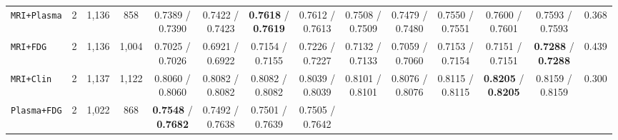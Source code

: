 \documentclass[10pt,twocolumn]{article}
\begin{document}
\begin{table}[t]
{\begin{tabular}{@{}>{\raggedright\arraybackslash}p{2.65cm}ccccccccccccc@{}}
\midrule
\texttt{MRI+Plasma} & 2 & 1,136 & 858 & \shortstack{0.7389 /\\0.7390} & \shortstack{0.7422
/\\0.7423} & \shortstack{\textbf{0.7618} /\\\textbf{0.7619}} & \shortstack{0.7612 /\\0.7613} &
\shortstack{0.7508 /\\0.7509} & \shortstack{0.7479 /\\0.7480} & \shortstack{0.7550 /\\0.7551} &
\shortstack{0.7600 /\\0.7601} & \shortstack{0.7593 /\\0.7593} & 0.368 \\
\texttt{MRI+FDG} & 2 & 1,136 & 1,004 & \shortstack{0.7025 /\\0.7026} & \shortstack{0.6921
/\\0.6922} & \shortstack{0.7154 /\\0.7155} & \shortstack{0.7226 /\\0.7227} & \shortstack{0.7132
/\\0.7133} & \shortstack{0.7059 /\\0.7060} & \shortstack{0.7153 /\\0.7154} &
\shortstack{0.7151 /\\0.7151} & \shortstack{\textbf{0.7288} /\\\textbf{0.7288}} & 0.439 \\
\texttt{MRI+Clin} & 2 & 1,137 & 1,122 & \shortstack{0.8060 /\\0.8060} & \shortstack{0.8082
/\\0.8082} & \shortstack{0.8082 /\\0.8082} & \shortstack{0.8039 /\\0.8039} & \shortstack{0.8101
/\\0.8101} & \shortstack{0.8076 /\\0.8076} & \shortstack{0.8115 /\\0.8115} &
\shortstack{\textbf{0.8205} /\\\textbf{0.8205}} & \shortstack{0.8159 /\\0.8159} & 0.300 \\
\texttt{Plasma+FDG} & 2 & 1,022 & 868 & \shortstack{\textbf{0.7548} /\\\textbf{0.7682}} &
\shortstack{0.7492 /\\0.7638} & \shortstack{0.7501 /\\0.7639} & \shortstack{0.7505 /\\0.7642} &

\end{tabular}}
\end{table}
\end{document}
